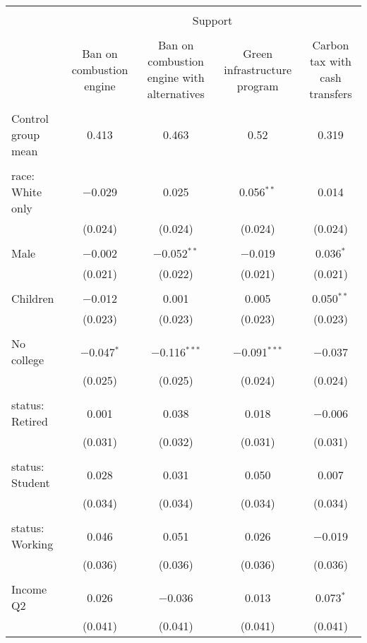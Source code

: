 
\begin{tabular}{@{\extracolsep{5pt}}lcccc} 
\\[-1.8ex]\hline 
\hline \\[-1.8ex] 
 & \multicolumn{4}{c}{Support} \\ 
\cline{2-5} 
\\[-1.8ex] & Ban on combustion engine & Ban on combustion engine with alternatives & Green infrastructure program & Carbon tax with cash transfers \\ 
\hline \\[-1.8ex] 
 Control group mean & 0.413 & 0.463 & 0.52 & 0.319  \\ \hline \\[-1.8ex] race: White only & $-$0.029 & 0.025 & 0.056$^{**}$ & 0.014 \\ 
  & (0.024) & (0.024) & (0.024) & (0.024) \\ 
  & & & & \\ 
 Male & $-$0.002 & $-$0.052$^{**}$ & $-$0.019 & 0.036$^{*}$ \\ 
  & (0.021) & (0.022) & (0.021) & (0.021) \\ 
  & & & & \\ 
 Children & $-$0.012 & 0.001 & 0.005 & 0.050$^{**}$ \\ 
  & (0.023) & (0.023) & (0.023) & (0.023) \\ 
  & & & & \\ 
 No college & $-$0.047$^{*}$ & $-$0.116$^{***}$ & $-$0.091$^{***}$ & $-$0.037 \\ 
  & (0.025) & (0.025) & (0.024) & (0.024) \\ 
  & & & & \\ 
 status: Retired & 0.001 & 0.038 & 0.018 & $-$0.006 \\ 
  & (0.031) & (0.032) & (0.031) & (0.031) \\ 
  & & & & \\ 
 status: Student & 0.028 & 0.031 & 0.050 & 0.007 \\ 
  & (0.034) & (0.034) & (0.034) & (0.034) \\ 
  & & & & \\ 
 status: Working & 0.046 & 0.051 & 0.026 & $-$0.019 \\ 
  & (0.036) & (0.036) & (0.036) & (0.036) \\ 
  & & & & \\ 
 Income Q2 & 0.026 & $-$0.036 & 0.013 & 0.073$^{*}$ \\ 
  & (0.041) & (0.041) & (0.041) & (0.041) \\ 

\end{tabular}
